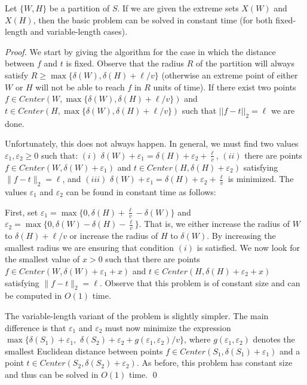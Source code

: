 \documentclass{llncs}
\def\eps{\varepsilon}
\newcommand{\cen}[1]{Center({#1})}
\begin{document}
\begin{lemma}\label{lemma:basic-cte}
Let $\{W,H\}$ be a partition of $S$. If we are given the extreme sets $X(W)$ and $X(H)$, then the basic problem can be solved in constant time (for both fixed-length and variable-length cases).
\end{lemma}
\begin{proof}
We start by giving the algorithm for the case in which the distance between $f$ and $t$ is fixed. Observe that the radius $R$ of the partition will always satisfy $R\geq \max\{\delta(W), \delta(H)+\ell/v\}$ (otherwise an extreme point of either $W$ or $H$ will not be able to reach $f$ in $R$ units of time). If there exist two points $f\in \cen{W,\max\{\delta(W),\delta(H)+\ell/v\}}$ and $t\in \cen{H,\max\{\delta(W), \delta(H)+\ell/v\}}$ such that $||f-t||_2=\ell$ we are done.

Unfortunately, this does not always happen. In general, we must find two values $\eps_1,\eps_2\geq 0$ such that: $(i)$ $\delta(W)+\eps_1=\delta(H)+\eps_2+\frac{\ell}{v}$, $(ii)$ there are points $f\in \cen{W,\delta(W)+\eps_1}$ and $t\in \cen{H,\delta(H)+\eps_2}$ satisfying $\|f-t\|_2=\ell$, and $(iii)$ $\delta(W)+\eps_1=\delta(H)+\eps_2+\frac{\ell}{v}$ is minimized. The values $\eps_1$ and $\eps_2$ can be found in constant time as follows:

First, set $\eps_1=\max\{0,\delta(H)+\frac{\ell}{v}-\delta(W)\}$ and $\eps_2=\max\{0,\delta(W)-\delta(H)-\frac{\ell}{v}\}$. That is, we either increase the radius of $W$ to $\delta(H)+\ell/v$ or increase the radius of $H$ to $\delta(W)$. By increasing the smallest radius we are ensuring that condition $(i)$ is satisfied. We now look for the smallest value of $x>0$ such that there are points $f\in \cen{W,\delta(W)+\eps_1+x}$ and $t\in \cen{H,\delta(H)+\eps_2+x}$ satisfying $\|f-t\|_2=\ell$. Observe that this problem is of constant size and can be computed in $O(1)$ time. 

The variable-length variant of the problem is slightly simpler.
The main difference is that $\eps_1$ and $\eps_2$ must now minimize the expression $\max\{\delta(S_1)+\eps_1,$ $\delta(S_2)+\eps_2+g(\eps_1,\eps_2)/v\}$, where $g(\eps_1,\eps_2)$ denotes the smallest Euclidean distance between points $f\in\cen{S_1,\delta(S_1)+\eps_1}$ and a point $t\in\cen{S_2,\delta(S_2)+\eps_2}$. As before, this problem has constant size and thus can be solved in $O(1)$ time. \qed

\end{proof}
\end{document}
